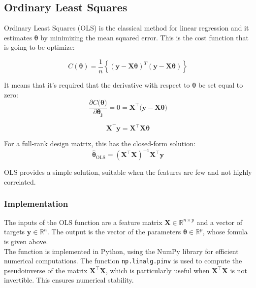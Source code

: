 \documentclass[
 reprint,            %
 amsmath,amssymb,
 aps,
]{revtex4-2}
\begin{document}
\subsection{Ordinary Least Squares}
Ordinary Least Squares (OLS) is the classical method for linear regression and it estimates $\boldsymbol{\theta}$ by minimizing the mean squared error\cite{hjorthjensen_week35}. This is the cost function that is going to be optimize:

$$
C(\boldsymbol{\theta})=\frac{1}{n}\left\{\left(\boldsymbol{y}-\boldsymbol{X}\boldsymbol{\theta}\right)^T\left(\boldsymbol{y}-\boldsymbol{X}\boldsymbol{\theta}\right)\right\}$$

It means that it's required that the derivative with respect to $\boldsymbol{\theta}$ be set equal to zero: $$\frac{\partial C(\boldsymbol{\theta)}}{\partial \boldsymbol{\theta_j}} =0= \mathbf{X}^\top(\mathbf{y-X\boldsymbol{\theta})}$$

$$\mathbf{X}^\top \mathbf{y}= \mathbf{X}^\top \mathbf{X} \boldsymbol{\theta}$$

For a full-rank design matrix, this has the closed-form solution:
$$
\hat{\boldsymbol{\theta}}_{\text{OLS}} = (\mathbf{X}^\top \mathbf{X})^{-1} \mathbf{X}^\top \mathbf{y}
$$

OLS provides a simple solution, suitable when the features are few and not highly correlated.

\subsubsection{Implementation}
The inputs of the OLS function are a feature matrix $\mathbf{X} \in \mathbb{R}^{n \times p}$ and a vector of targets $\mathbf{y} \in \mathbb{R}^n$. The output is the vector of the parameters $\boldsymbol{\theta} \in \mathbb{R}^{p}$, whose fomula is given above.\\
The function is implemented in Python, using the NumPy library for efficient numerical computations. The function \texttt{np.linalg.pinv} is used to compute the pseudoinverse of the matrix $\mathbf{X}^\top \mathbf{X}$, which is particularly useful when $\mathbf{X}^\top \mathbf{X}$ is not invertible. This ensures numerical stability.
\end{document}
